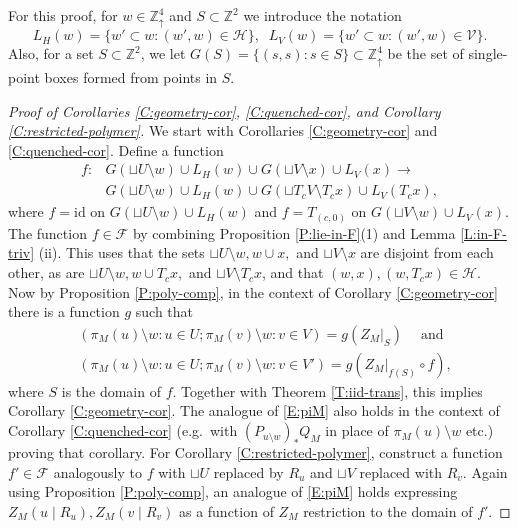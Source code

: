 \documentclass[aop, preprint]{imsart}
\theoremstyle{plain}
\theoremstyle{definition}
\theoremstyle{plain}
\newcommand{\sset}{\subset}
\newcommand{\mathand}{\;\text{and}\;}
\newcommand{\Zd}{\mathds{Z}^4_\uparrow}
\newcommand{\scrV}{\mathcal{V}}
\newcommand{\scrH}{\mathcal{H}}
\newcommand{\scrF}{\mathcal{F}}
\newcommand{\Z}{\mathds{Z}}
\newcommand{\id}{\text{id}}
\newcommand{\smin}{\setminus}
\begin{document}
For this proof, for $w \in \Zd$ and $S \sset \Z^2$ we introduce the notation
$$
L_H(w) = \{w' \sset w : (w', w) \in \scrH\}, \;\; L_V(w) = \{w' \sset w : (w', w) \in \scrV\}.
$$
Also, for a set $S \sset \Z^2$, we let
$
 G(S) = \{(s, s) : s \in S\} \sset \Zd
 $
be the set of single-point boxes formed from points in $S$.
\begin{proof}[Proof of Corollaries \ref{C:geometry-cor}, \ref{C:quenched-cor}, and Corollary \ref{C:restricted-polymer}]
	We start with Corollaries \ref{C:geometry-cor} and \ref{C:quenched-cor}. Define a function
	\begin{equation*}
	\begin{split}
	f:&G(\sqcup U \smin w) \cup L_H(w) \cup G(\sqcup V \smin x) \cup L_V(x) \to \\
	&G(\sqcup U \smin w) \cup L_H(w) \cup G(\sqcup T_c V \smin T_c x) \cup L_V(T_c x), 
	\end{split}
	\end{equation*}
	where $f = \id$ on $G(\sqcup U \smin w) \cup L_H(w)$ and $f = T_{(c, 0)}$ on $G(\sqcup V \smin w) \cup L_V(x)$. The function $f \in \scrF$ by combining Proposition \ref{P:lie-in-F}(1) and Lemma \ref{L:in-F-triv} (ii). This uses that the sets $\sqcup U \smin w, w \cup x,$ and $\sqcup V \smin x$ are disjoint from each other, as are $\sqcup U \smin w, w \cup T_c x,$ and $\sqcup V \smin T_c x$, and that $(w, x), (w, T_c x) \in \scrH$. Now by Proposition \ref{P:poly-comp}, in the context of Corollary \ref{C:geometry-cor} there is a function $g$ such that
	\begin{equation}
	\label{E:piM}
	\begin{split}
	&(\pi_M(u) \smin w : u \in U; \pi_M(v) \smin w : v \in V) = g(Z_M|_{S}) \quad \mathand \\
	&(\pi_M(u) \smin w : u \in U; \pi_M(v) \smin w : v \in V') = g(Z_M|_{f(S)} \circ f),
	\end{split}
	\end{equation}
	where $S$ is the domain of $f$. Together with Theorem \ref{T:iid-trans}, this implies Corollary \ref{C:geometry-cor}. The analogue of \eqref{E:piM} also holds in the context of Corollary \ref{C:quenched-cor} (e.g.\ with $(P_{u \smin w})_*Q_M$ in place of $\pi_M(u) \smin w$ etc.) proving that corollary. For Corollary \ref{C:restricted-polymer}, construct a function $f' \in \scrF$ analogously to $f$ with $\sqcup U$ replaced by $R_u$ and $\sqcup V$ replaced with $R_v$. Again using Proposition \ref{P:poly-comp}, an analogue of \eqref{E:piM} holds expressing $Z_M(u \; | \; R_u), Z_M(v \; | \; R_v)$ as a function of $Z_M$ restriction to the domain of $f'$.
\end{proof}
\end{document}
